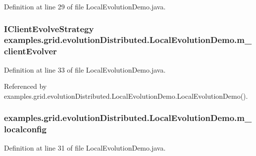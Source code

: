 Definition at line 29 of file Local\-Evolution\-Demo.\-java.

\hypertarget{classexamples_1_1grid_1_1evolution_distributed_1_1_local_evolution_demo_ac103e14a2676fda0d390fe58bf830c68}{
\subsubsection[{m\-\_\-client\-Evolver}]{\setlength{\rightskip}{0pt plus 5cm}I\-Client\-Evolve\-Strategy examples.\-grid.\-evolution\-Distributed.\-Local\-Evolution\-Demo.\-m\-\_\-client\-Evolver\hspace{0.3cm}{\ttfamily [private]}}}\label{classexamples_1_1grid_1_1evolution_distributed_1_1_local_evolution_demo_ac103e14a2676fda0d390fe58bf830c68}


Definition at line 33 of file Local\-Evolution\-Demo.\-java.



Referenced by examples.\-grid.\-evolution\-Distributed.\-Local\-Evolution\-Demo.\-Local\-Evolution\-Demo().

\hypertarget{classexamples_1_1grid_1_1evolution_distributed_1_1_local_evolution_demo_abde92093fa558697aafd74f680183cf9}{
\subsubsection[{m\-\_\-localconfig}]{ examples.\-grid.\-evolution\-Distributed.\-Local\-Evolution\-Demo.\-m\-\_\-localconfig\hspace{0.3cm}{\ttfamily [private]}}}\label{classexamples_1_1grid_1_1evolution_distributed_1_1_local_evolution_demo_abde92093fa558697aafd74f680183cf9}


Definition at line 31 of file Local\-Evolution\-Demo.\-java.



